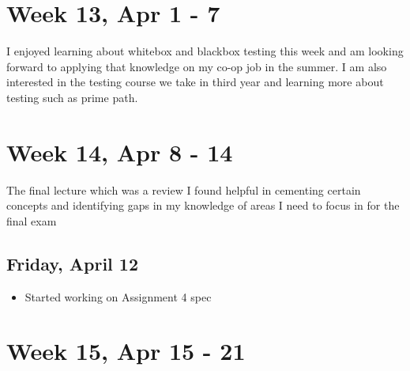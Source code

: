 \documentclass{article}
\begin{document}
\section{Week 13, Apr 1 - 7}

I enjoyed learning about whitebox and blackbox testing this week and am looking forward to applying that knowledge on my co-op job in the summer. I am also interested in the testing course we take in third year and learning more about testing such as prime path.

\section{Week 14, Apr 8 - 14}

The final lecture which was a review I found helpful in cementing certain concepts and identifying gaps in my knowledge of areas I need to focus in for the final exam

\subsection{Friday, April 12}
\begin{itemize}
    \item Started working on Assignment 4 spec
\end{itemize}

\section{Week 15, Apr 15 - 21}
\end{document}
